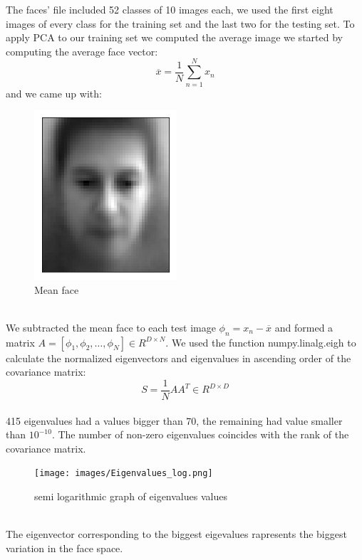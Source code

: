 \documentclass[10pt,twocolumn,letterpaper]{article}
\begin{document}
The faces' file included 52 classes of 10 images each, we used the first eight images of every class for the training set and the last two for the testing set. To apply PCA to our training set we computed the average image we started by computing the average face vector:
\begin{equation}
    \overline{x}  = \frac{1}{N}\sum^N_{n=1}x_n
\end{equation}
and we came up with:
\begin{figure}[h]
    \centering
    \includegraphics[width=0.6\columnwidth]{Mean_face}
    \caption{Mean face}
    \label{fig:mean face}
\end{figure}
\\We subtracted the mean face to each test image $\phi_n=x_n-\overline{x}$ and formed a matrix $A=[\phi_1,\phi_2,\ldots,\phi_N]\in R^{D\times N}$. We used the function numpy.linalg.eigh to calculate the normalized eigenvectors and eigenvalues in ascending order of the covariance matrix:
\begin{equation}
    S = \frac{1}{N}AA^T \in R^{D\times D}
\end{equation}
\\415 eigenvalues had a values bigger than 70, the remaining had value smaller than $10^{-10}$. The number of non-zero eigenvalues coincides with the rank of the covariance matrix.
\begin{figure}[h]
    \centering
    \texttt{[image: images/Eigenvalues\_log.png]} 
    \caption{semi logarithmic graph of eigenvalues values}
    \label{fig:eigenvalues_log}
\end{figure}
\\The eigenvector corresponding to the biggest eigevalues rapresents the biggest variation in the face space.
\end{document}
